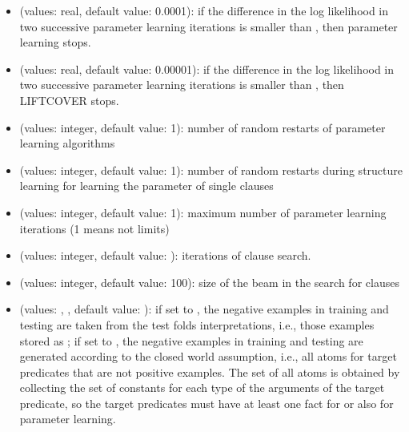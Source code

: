 \documentclass[letterpaper,10pt,english]{sphinxmanual}
\begin{document}
\begin{itemize}
\item {} 
\sphinxAtStartPar
{} (values: real, default value: 0.0001): if the difference in the log likelihood in two successive parameter learning iterations is smaller than , then parameter learning stops.

\item {} 
\sphinxAtStartPar
{} (values: real, default value: 0.00001): if the difference in the log likelihood in two successive parameter learning iterations is smaller than , then LIFTCOVER stops.

\item {} 
\sphinxAtStartPar
{} (values: integer, default value: 1): number of random restarts of parameter learning algorithms

\item {} 
\sphinxAtStartPar
{} (values: integer, default value: 1): number of random restarts during structure learning for learning the parameter of single clauses

\item {} 
\sphinxAtStartPar
{} (values: integer, default value: \sphinxhyphen{}1): maximum number of parameter learning iterations (\sphinxhyphen{}1 means not limits)

\item {} 
\sphinxAtStartPar
{} (values: integer, default value: ): iterations of clause search.

\item {} 
\sphinxAtStartPar
{} (values: integer, default value: 100): size of the beam in the search for clauses

\item {} 
\sphinxAtStartPar
{} (values: , , default value: ): if set to , the negative examples in training and testing are taken from the test folds interpretations, i.e., those examples  stored as ; if set to , the negative examples in training and testing are generated according to the closed world assumption, i.e., all atoms for target predicates that are not positive examples. The set of all atoms is obtained by collecting the set of constants for each type of the arguments of the target predicate, so the target predicates must have at least one fact for  or  also for parameter learning.


\end{itemize}
\end{document}
